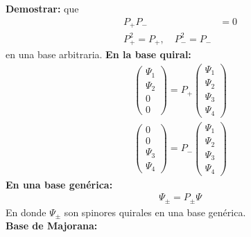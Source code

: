 \documentclass[../main.tex]{subfiles}
\begin{document}
 \textbf{Demostrar:} que
 \begin{align*}
   P_+ P_- & = 0 \\
   P^2_+ = P_+ , \quad P^2_- = P_-
 \end{align*}
 en una base arbitraria.
 \textbf{En la base quiral:}
 \begin{align*}
   \begin{pmatrix}
    \Psi_1 \\ \Psi_2 \\ 0 \\ 0 
   \end{pmatrix} = P_+ \begin{pmatrix}
     \Psi_1 \\ \Psi_2 \\ \Psi_3 \\ \Psi_4
   \end{pmatrix}
   \\
   \begin{pmatrix}
     0 \\ 0 \\ \Psi_3 \\ \Psi_4
   \end{pmatrix} = P_- 
   \begin{pmatrix}
     \Psi_1 \\ \Psi_2 \\ \Psi_3 \\ \Psi_4
   \end{pmatrix}
 \end{align*}
 \textbf{En una base genérica:}
 \begin{align*}
   \Psi_{\pm} = P_{\pm} \Psi
 \end{align*}
 En donde $\Psi_{\pm}$ son spinores quirales en una base genérica. \\
 \textbf{Base de Majorana:}
\end{document}
